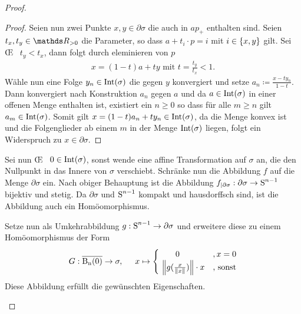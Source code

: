\begin{Satz}
\begin{proof}
\begin{enumerate}[$a)$:]
\begin{Beh}
\begin{proof}
          Seien nun zwei Punkte $x,y \in \partial\sigma$ die auch in
          $ap_+$ enthalten sind. Seien $t_x, t_y \in \R_{> 0}$ die
          Parameter, so dass $a + t_i \cdot p = i$ mit
          $i \in \sset{x,y}$ gilt. Sei \OE~ $t_y < t_x$, dann folgt
          durch eleminieren von $p$
          \begin{gather*}
            x = (1-t) a + ty \text{ mit } t=\frac{t_y}{t_x} < 1.
          \end{gather*}
          Wähle nun eine Folge $y_n \in \Int(\sigma)$ die gegen $y$
          konvergiert und setze $a_n \coloneqq \frac{x -ty_n}{1-t}$.
          Dann konvergiert nach Konstruktion $a_n$ gegen $a$ und da
          $a \in \Int(\sigma)$ in einer offenen Menge enthalten ist,
          existiert ein $n \geq 0$ so dass für alle $m \geq n$ gilt
          $a_m \in \Int(\sigma)$. Somit gilt
          $x = (1-t) a_n + ty_n \in \Int(\sigma)$, da die Menge konvex
          ist und die Folgenglieder ab einem $m$ in der Menge
          $\Int(\sigma)$ liegen, folgt ein Widerspruch zu
          $x \in \partial\sigma$.
        \end{proof}
      \end{Beh}
      Sei nun \OE~ $0 \in \Int(\sigma)$, sonst wende eine affine
      Transformation auf $\sigma$ an, die den Nullpunkt in das Innere
      von $\sigma$ verschiebt.  
      Schränke nun die Abbildung $f$ auf die
      Menge $\partial\sigma$ ein. Nach obiger Behauptung ist die
      Abbildung
      $f_{| \partial\sigma} : \partial\sigma \rightarrow \Sp^{n-1}$
      bijektiv und stetig. Da $\partial\sigma$ und $\Sp^{n-1}$ kompakt und
      hausdorffsch sind, ist die Abbildung auch ein Homöomorphismus.
      
      Setze nun als Umkehrabbildung $g : \Sp^{n-1} \rightarrow \partial\sigma$ 
      und erweitere diese zu einem Homöomorphismus der Form
      \begin{gather*}
        G : \Bn \rightarrow \sigma , \hspace{0.5cm}
        x \mapsto 
        \begin{cases}
          \hspace{.7cm}0 & , x = 0 \\
          ~\nn[g(\frac{x}{\nn[x]})] \cdot x & \text{, sonst}
        \end{cases}
      \end{gather*}
      Diese Abbildung erfüllt die gewünschten Eigenschaften.
    \end{enumerate}
  \end{proof}
\end{Satz}


